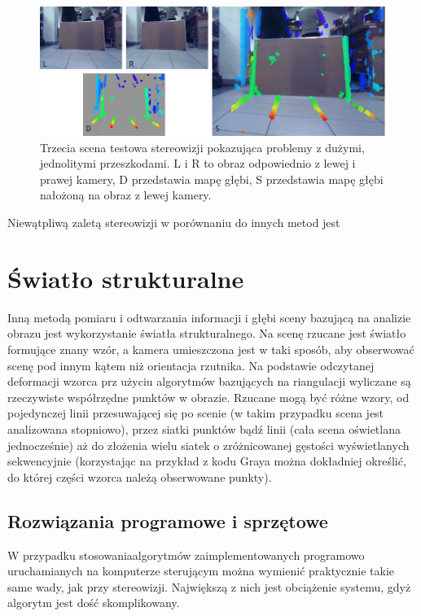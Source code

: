 \begin{figure}[h!]
\centering
\includegraphics{../img/stereo_3}
\caption[Trzecia scena testowa stereowizji]{Trzecia scena testowa stereowizji pokazująca problemy z dużymi, jednolitymi przeszkodami. L i R to obraz odpowiednio z lewej i prawej kamery, D przedstawia mapę głębi, S przedstawia mapę głębi nałożoną na obraz z lewej kamery.}
\label{fig:stereo_3}
\end{figure}

Niewątpliwą zaletą stereowizji w porównaniu do innych metod jest

\section{Światło strukturalne}

Inną metodą pomiaru i odtwarzania informacji i głębi sceny bazującą na analizie
obrazu jest wykorzystanie światła strukturalnego. Na scenę rzucane jest światło
formujące znany wzór, a kamera umieszczona jest w taki sposób, aby obserwować
scenę pod innym kątem niż orientacja rzutnika. Na podstawie odczytanej deformacji
wzorca prz użyciu algorytmów bazujących na riangulacji wyliczane są rzeczywiste
współrzędne punktów w obrazie. Rzucane mogą być różne wzory, od pojedynczej linii
przesuwającej się po scenie (w takim przypadku scena jest analizowana stopniowo),
przez siatki punktów bądź linii (cała scena oświetlana jednocześnie) aż do złożenia
wielu siatek o zróżnicowanej gęstości wyświetlanych sekwencyjnie (korzystając
na przykład z kodu Graya można dokładniej określić, do której części wzorca należą
obserwowane punkty).

\subsection{Rozwiązania programowe i sprzętowe}

W przypadku stosowaniaalgorytmów zaimplementowanych programowo uruchamianych na
komputerze sterującym można wymienić praktycznie takie same wady, jak przy stereowizji.
Największą z nich jest obciążenie systemu, gdyż algorytm jest dość skomplikowany.

